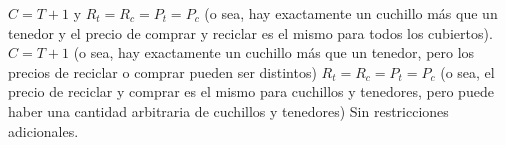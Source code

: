 \documentclass{oci}
\begin{document}
\newpage

\begin{scoreDescription}
 $C=T+1$ y  $R_t= R_c = P_t = P_c$ (o sea, hay exactamente un cuchillo más que un tenedor y el precio de comprar y reciclar es el mismo para todos los cubiertos).
 $C=T+1$ (o sea, hay exactamente un cuchillo más que un tenedor, pero los precios de reciclar o comprar pueden ser distintos)
 $R_t= R_c = P_t = P_c$ (o sea, el precio de reciclar y comprar es el mismo para cuchillos y tenedores, pero puede haber una cantidad arbitraria de cuchillos y tenedores)
 Sin restricciones adicionales.
\end{scoreDescription}

\begin{sampleDescription}
\end{sampleDescription}
\end{document}
